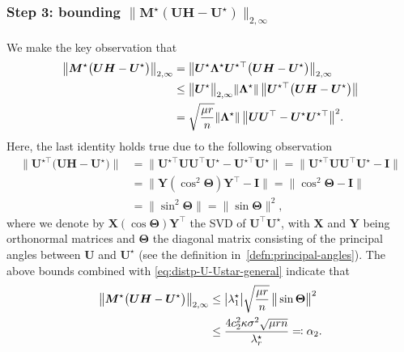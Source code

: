 \subsubsection{Step 3: bounding $\|\bm{M}^{\star} (\bm{U}\bm{H}-\bm{U}^{\star} ) \|_{2,\infty}$}


We make the key observation that
%
\begin{align}
\big\|\bm{M}^{\star}\big(\bm{U}\bm{H}-\bm{U}^{\star}\big)\big\|_{2,\infty} & =\big\|\bm{U}^{\star}\bm{\Lambda}^{\star}\bm{U}^{\star\top}\big(\bm{U}\bm{H}-\bm{U}^{\star}\big)\big\|_{2,\infty} \notag\\
 & \leq\big\|\bm{U}^{\star}\big\|_{2,\infty} \|\bm{\Lambda}^{\star}\|\, \big\|\bm{U}^{\star\top}\big(\bm{U}\bm{H}-\bm{U}^{\star}\big)\big\| \notag\\
	& =  \sqrt{\frac{\mu r}{n}} \|\bm{\Lambda}^{\star}\|\, \big\|\bm{U}\bm{U}^{\top} - \bm{U}^{\star} \bm{U}^{\star\top} \big\|^{2}.
	\label{eq:Mstar-UH-Ustar-2-UB-123}
\end{align}
%
Here, the last identity holds true due to the following observation
%
\begin{align*}
\big\|\bm{U}^{\star\top}\big(\bm{U}\bm{H}-\bm{U}^{\star}\big)\big\| & =\big\|\bm{U}^{\star\top}\bm{U}\bm{U}^{\top}\bm{U}^{\star}-\bm{U}^{\star\top}\bm{U}^{\star}\big\|=\big\|\bm{U}^{\star\top}\bm{U}\bm{U}^{\top}\bm{U}^{\star}-\bm{I}\big\|\\
 & =\big\|\bm{Y}(\cos^{2}\bm{\Theta})\bm{Y}^{\top}-\bm{I}\big\|=\big\| \cos^{2}  \bm{\Theta} - \bm{I} \big\|\\
	& =\big\|\sin^{2}\bm{\Theta}\big\|=\big\|\sin\bm{\Theta}\big\|^2,
\end{align*}
%
where we denote by $\bm{X}(\cos \bm{\Theta}) \bm{Y}^{\top}$ the SVD of $\bm{U}^{\top}\bm{U}^{\star}$, with $\bm{X}$ and $\bm{Y}$ being orthonormal matrices and $\bm{\Theta}$ the diagonal matrix consisting of the principal angles between $\bm{U}$ and $\bm{U}^{\star}$ (see the definition in~\eqref{defn:principal-angles}). The above bounds combined with \eqref{eq:distp-U-Ustar-general} indicate that
%
\begin{align}
\big\|\bm{M}^{\star}\big(\bm{U}\bm{H}-\bm{U}^{\star}\big)\big\|_{2,\infty} & \leq
	\big|\lambda_{1}^{\star}\big| \sqrt{\frac{\mu r}{n}} \, \big\|\sin\bm{\Theta}\big\|^2
	\notag\\
	& \leq \frac{4c_{2}^{2}\kappa\sigma^{2}\sqrt{\mu rn}}{\lambda_{r}^{\star}}
 \eqqcolon \alpha_2.
	\label{eq:Mstar-UH-Ustar-2inf}
\end{align}
%



